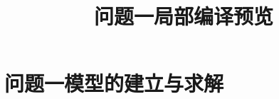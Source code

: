 \documentclass[withoutpreface]{../../../paper/cumcmthesis}
\title{问题一局部编译预览}
\begin{document}
\maketitle
\section{问题一模型的建立与求解}

\end{document}
